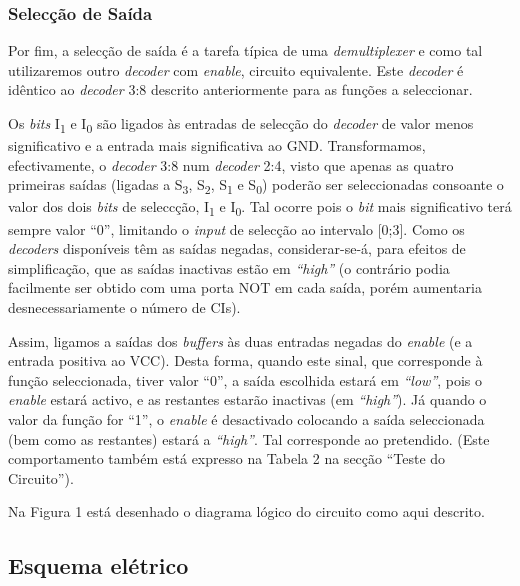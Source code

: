 \documentclass[a4paper,12pt]{article}
\begin{document}
\subsubsection{Selecção de Saída}
Por fim, a selecção de saída é a tarefa típica de uma {\it demultiplexer} e como tal utilizaremos outro {\it decoder} com {\it enable}, circuito equivalente. Este {\it decoder} é idêntico ao {\it decoder} 3:8 descrito anteriormente para as funções a seleccionar.
\par 
Os {\it bits} I\textsubscript{1} e I\textsubscript{0} são ligados às entradas de selecção do {\it decoder} de valor menos significativo e a entrada mais significativa ao GND. Transformamos, efectivamente, o {\it decoder} 3:8 num {\it decoder} 2:4, visto que apenas as quatro primeiras saídas (ligadas a S\textsubscript{3}, S\textsubscript{2}, S\textsubscript{1} e S\textsubscript{0}) poderão ser seleccionadas consoante o valor dos dois {\it bits} de seleccção, I\textsubscript{1} e I\textsubscript{0}. Tal ocorre pois o {\it bit} mais significativo terá sempre valor ``0'', limitando o {\it input} de selecção ao intervalo [0;3]. Como os {\it decoders} disponíveis têm as saídas negadas, considerar-se-á, para efeitos de simplificação, que as saídas inactivas estão em {\it ``high''} (o contrário podia facilmente ser obtido com uma porta NOT em cada saída, porém aumentaria desnecessariamente o número de CIs). 
\par
Assim, ligamos a saídas dos {\it buffers} às duas entradas negadas do {\it enable} (e a entrada positiva ao VCC). Desta forma, quando este sinal, que corresponde à função seleccionada, tiver valor ``0'', a saída escolhida estará em {\it ``low''}, pois o {\it enable} estará activo, e as restantes estarão inactivas (em {\it ``high''}). Já quando o valor da função for ``1'', o {\it enable} é desactivado colocando a saída seleccionada (bem como as restantes) estará a {\it ``high''}. Tal corresponde ao pretendido. (Este comportamento também está expresso na Tabela 2 na secção ``Teste do Circuito'').
\par
Na Figura 1 está desenhado o diagrama lógico do circuito como aqui descrito.

\subsection{Esquema elétrico}
\end{document}
